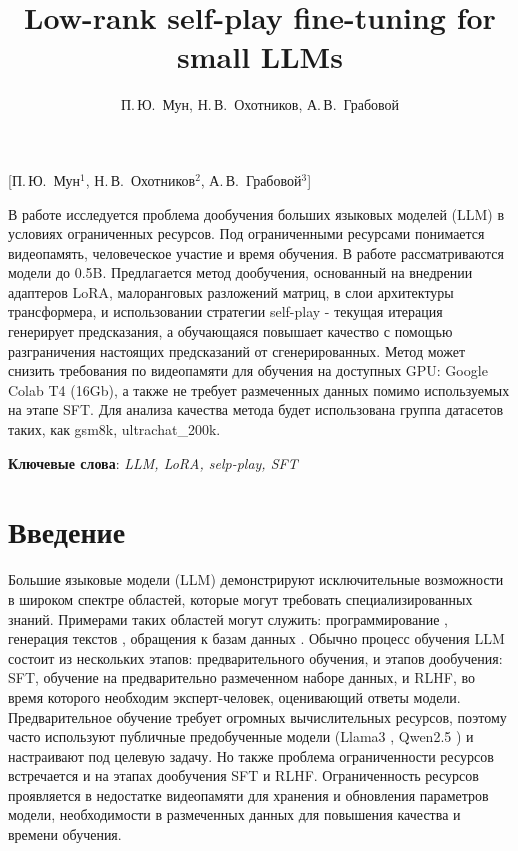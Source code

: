 \documentclass[12pt, twoside]{article}
\begin{document}
\title
    [] %
    {Low-rank self-play fine-tuning for small LLMs}
\author
    [] %
    {П.\,Ю.~Мун, Н.\,В.~Охотников, А.\,В.~Грабовой} %
    [П.\,Ю.~Мун$^1$, Н.\,В.~Охотников$^2$, А.\,В.~Грабовой$^3$] %

\abstract
  {В работе исследуется проблема дообучения больших языковых моделей (LLM) в условиях ограниченных ресурсов. Под ограниченными ресурсами понимается видеопамять, человеческое участие и время обучения. В работе рассматриваются модели до 0.5B. Предлагается метод дообучения, основанный на внедрении адаптеров LoRA, малоранговых разложений матриц, в слои архитектуры трансформера, и использовании стратегии self-play - текущая итерация генерирует предсказания, а обучающаяся повышает качество с помощью разграничения настоящих предсказаний от сгенерированных. Метод может снизить требования по видеопамяти для обучения на доступных GPU: Google Colab T4 (16Gb), а также не требует размеченных данных помимо используемых на этапе SFT. Для анализа качества метода будет использована группа датасетов таких, как gsm8k, ultrachat_200k.


\bigskip
\noindent
\textbf{Ключевые слова}: \emph {LLM, LoRA, selp-play, SFT}
}
\doi{}
\receivedRus{}
\receivedEng{}

\maketitle
\linenumbers
\section{Введение}
Большие языковые модели (LLM) демонстрируют исключительные возможности в широком спектре областей, которые могут требовать специализированных знаний. Примерами таких областей могут служить: программирование \parencite{Chen2021}, генерация текстов \parencite{Touvron2023}, обращения к базам данных \parencite{Zhong2017}. Обычно процесс обучения LLM состоит из нескольких этапов: предварительного обучения, и этапов дообучения: SFT, обучение на предварительно размеченном наборе данных, и RLHF, во время которого необходим эксперт-человек, оценивающий ответы модели. Предварительное обучение требует огромных вычислительных ресурсов, поэтому часто используют публичные предобученные модели (Llama3 \parencite{Dubey2024}, Qwen2.5 \parencite{Yang2025}) и настраивают под целевую задачу. Но также проблема ограниченности ресурсов встречается и на этапах дообучения SFT и RLHF. Ограниченность ресурсов проявляется в недостатке видеопамяти для хранения и обновления параметров модели, необходимости в размеченных данных для повышения качества и времени обучения.
\end{document}
